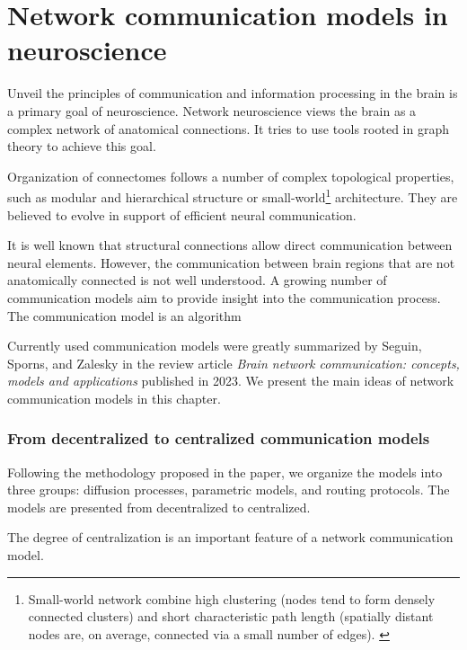 \chapter{Network communication models in neuroscience}


Unveil the principles of communication and information processing in the brain is a primary goal of neuroscience. Network neuroscience views the brain as a complex network of anatomical connections. It tries to use tools rooted in graph theory to achieve this goal.  

Organization of connectomes follows a number of complex topological properties, such as modular and hierarchical structure or small-world\footnote{Small-world network combine high clustering (nodes tend to form densely connected clusters) and short characteristic path length (spatially distant nodes are, on average, connected via a small number of edges). \cite{seguin_brain_2023}} architecture. They are believed to evolve in support of efficient neural communication. \cite{seguin_brain_2023,avena-koenigsberger_communication_2018}

It is well known that structural connections allow direct communication between neural elements. However, the communication between brain regions that are not anatomically connected is not well understood. A growing number of communication models aim to provide insight into the communication process. The communication model is an algorithm \TODO \cite{seguin_brain_2023}

Currently used communication models were greatly summarized by Seguin, Sporns, and Zalesky in the review article \textit{Brain network communication: concepts, models and applications} published in 2023. \cite{seguin_brain_2023} We present the main ideas of network communication models in this chapter. 

\subsection{From decentralized to centralized communication models}

Following the methodology proposed in the paper, we organize the models into three groups: diffusion processes, parametric models, and routing protocols. The models are presented from decentralized to centralized. 

The degree of centralization is an important feature of a network communication model. \TODO[co to je a proč]

